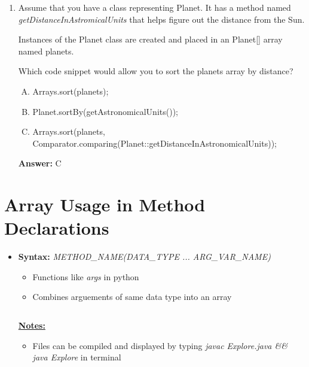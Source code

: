 \documentclass[12pt]{article}
\begin{document}
\begin{enumerate}[1.]
    \item

    Assume that you have a class representing Planet. It has a method named\\
    \textit{getDistanceInAstromicalUnits} that helps figure out the distance from the Sun.

    \bigskip

    Instances of the Planet class are created and placed in an Planet[] array named
    planets.

    \bigskip

    Which code snippet would allow you to sort the planets array by distance?

    \begin{enumerate}[A.]
        \item Arrays.sort(planets);
        \item Planet.sortBy(getAstronomicalUnits());
        \item Arrays.sort(planets, Comparator.comparing(Planet::getDistanceInAstronomicalUnits));
    \end{enumerate}

    \bigskip

    \textbf{Answer:} C

\end{enumerate}

\bigskip

\section{Array Usage in Method Declarations}

\bigskip

\begin{itemize}
    \item \textbf{Syntax:} \textit{METHOD\_NAME(DATA\_TYPE ... ARG\_VAR\_NAME)}
    \begin{itemize}
        \item Functions like \textit{args} in python
        \item Combines arguements of same data type into an array
    \end{itemize}

    \begin{lstlisting}[language=Java, caption={lesson\_05/Explore.java}]

    \end{lstlisting}

    \bigskip

    \underline{\textbf{Notes:}}

    \bigskip

    \begin{itemize}
        \item Files can be compiled and displayed by typing \textit{javac Explore.java \&\& java Explore}
        in terminal
    \end{itemize}
\end{itemize}
\end{document}

